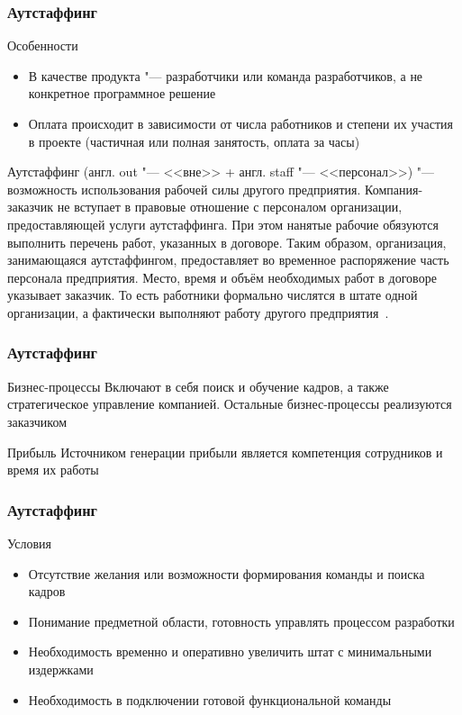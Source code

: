 \documentclass{../industrial-development}
\begin{document}
\begin{frame} \frametitle{Аутстаффинг}
	\begin{block}{Особенности}
		\begin{itemize}
			\item В качестве продукта "--- разработчики или команда разработчиков, а не конкретное программное решение
			\item Оплата происходит в зависимости от числа работников и степени их участия в проекте (частичная или полная занятость, оплата за часы)
		\end{itemize}
	\end{block}
\end{frame}

\lecturenotes

Аутстаффинг (англ. out "--- <<вне>> + англ. staff "--- <<персонал>>) "--- возможность использования рабочей силы другого предприятия. Компания-заказчик не вступает в правовые отношение с персоналом организации, предоставляющей услуги аутстаффинга. При этом нанятые рабочие обязуются выполнить перечень работ, указанных в договоре. Таким образом, организация, занимающаяся аутстаффингом, предоставляет во временное распоряжение часть персонала предприятия. Место, время и объём необходимых работ в договоре указывает заказчик. То есть работники формально числятся в штате одной организации, а фактически выполняют работу другого предприятия~\cite{Delatdelo}.


\begin{frame} \frametitle{Аутстаффинг}
	\begin{block}{Бизнес-процессы}
		Включают в себя поиск и обучение кадров, а также стратегическое управление компанией. Остальные бизнес-процессы реализуются заказчиком
	\end{block}
	\begin{block}{Прибыль}
		Источником генерации прибыли является компетенция сотрудников и время их работы
	\end{block}
\end{frame}


\begin{frame} \frametitle{Аутстаффинг}
	\begin{block}{Условия}
		\begin{itemize}
			\item Отсутствие желания или возможности формирования команды и поиска кадров
			\item Понимание предметной области, готовность управлять процессом разработки
			\item Необходимость временно и оперативно увеличить штат с минимальными издержками
			\item Необходимость в подключении готовой функциональной команды
		\end{itemize}
	\end{block}
\end{frame}
\end{document}
